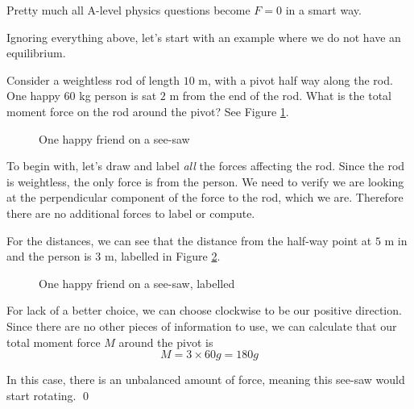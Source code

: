 Pretty much all A-level physics questions become $F=0$ in a smart way.

Ignoring everything above, let's start with an example where we do not have an equilibrium.

\begin{example}
    Consider a weightless rod of length $10$ m, with a pivot half way along the rod. One happy $60$ kg person is sat $2$ m from the end of the rod. What is the total moment force on the rod around the pivot?
    See Figure \ref{fig:moment_seesaw_unbalanced}.
    \begin{figure}[H]
    \centering
    \caption{One happy friend on a see-saw}
    \label{fig:moment_seesaw_unbalanced}
    \end{figure}
\end{example}

\begin{solution}
    To begin with, let's draw and label \emph{all} the forces affecting the rod. Since the rod is weightless, the only force is from the person. 
    We need to verify we are looking at the perpendicular component of the force to the rod, which we are. Therefore there are no additional forces to label or compute.

    For the distances, we can see that the distance from the half-way point at $5$ m in and the person is $3$ m, labelled in Figure \ref{fig:moment_seesaw_unbalanced_labelled}.
    \begin{figure}[H]
    \centering
    \caption{One happy friend on a see-saw, labelled}
    \label{fig:moment_seesaw_unbalanced_labelled}
    \end{figure}

    For lack of a better choice, we can choose clockwise to be our positive direction. 
    Since there are no other pieces of information to use, we can calculate that our total moment force $M$ around the pivot is
    \[ M = 3 \times 60g = 180g \]

    In this case, there is an unbalanced amount of force, meaning this see-saw would start rotating.
    \qed
\end{solution}


